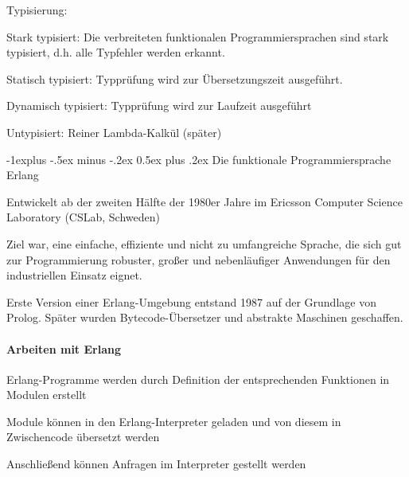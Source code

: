 \documentclass[10pt]{article}
\makeatletter
\renewcommand{\subsection}{\@startsection{subsection}{2}{0mm}%
                                {-1explus -.5ex minus -.2ex}%
                                {0.5ex plus .2ex}%
                                {\normalfont\normalsize\bfseries}}
\makeatother
\begin{document}
\begin{itemize*}
\begin{itemize*}
\begin{itemize*}
    \end{itemize*}
  \end{itemize*}
  \item Typisierung:
  \begin{itemize*}
    \item Stark typisiert: Die verbreiteten funktionalen Programmiersprachen sind stark typisiert, d.h. alle Typfehler werden erkannt.
    \begin{itemize*}
      \item Statisch typisiert: Typprüfung wird zur Übersetzungszeit ausgeführt.
      \item Dynamisch typisiert: Typprüfung wird zur Laufzeit ausgeführt
    \end{itemize*}
    \item Untypisiert: Reiner Lambda-Kalkül (später)
  \end{itemize*}
\end{itemize*}

\subsection{Die funktionale Programmiersprache Erlang}
\begin{itemize*}
  \item Entwickelt ab der zweiten Hälfte der 1980er Jahre im Ericsson Computer Science Laboratory (CSLab, Schweden)
  \item Ziel war, eine einfache, effiziente und nicht zu umfangreiche Sprache, die sich gut zur Programmierung robuster, großer und nebenläufiger Anwendungen für den industriellen Einsatz eignet.
  \item Erste Version einer Erlang-Umgebung entstand 1987 auf der Grundlage von Prolog. Später wurden Bytecode-Übersetzer und abstrakte Maschinen geschaffen.
\end{itemize*}

\paragraph{Arbeiten mit Erlang}
\begin{itemize*}
  \item Erlang-Programme werden durch Definition der entsprechenden Funktionen in Modulen erstellt
  \item Module können in den Erlang-Interpreter geladen und von diesem in Zwischencode übersetzt werden
  \item Anschließend können Anfragen im Interpreter gestellt werden
\end{itemize*}
\end{document}
